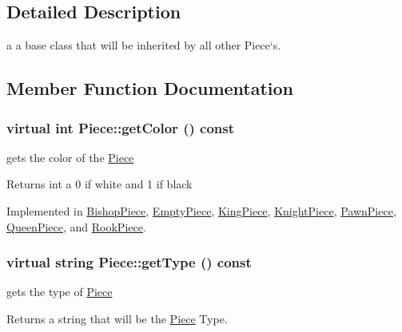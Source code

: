 \subsection{Detailed Description}
a a base class that will be inherited by all other Piece`s. 

\subsection{Member Function Documentation}
\hypertarget{classPiece_a1376072d4815719e60253ce5688df95c}{
\subsubsection[{getColor}]{\setlength{\rightskip}{0pt plus 5cm}virtual int Piece::getColor () const}}
\label{classPiece_a1376072d4815719e60253ce5688df95c}


gets the color of the \hyperlink{classPiece}{Piece} \begin{DoxyReturn}{Returns}
int a 0 if white and 1 if black 
\end{DoxyReturn}


Implemented in \hyperlink{classBishopPiece_ae40042d8edb9172b97955a1a3d651434}{BishopPiece}, \hyperlink{classEmptyPiece_aa0ae8e05e0471cf05e17bc9f56e30188}{EmptyPiece}, \hyperlink{classKingPiece_ac15e38c6ceaccae6879ec70211c2ab28}{KingPiece}, \hyperlink{classKnightPiece_ab8ef95a1a625e461ada96e4692599770}{KnightPiece}, \hyperlink{classPawnPiece_abe56912427ff110820b34223e5f60cda}{PawnPiece}, \hyperlink{classQueenPiece_a461d58f951b5e9f4d120cec0c47a1d9c}{QueenPiece}, and \hyperlink{classRookPiece_a15b00afd7fe0fe1035c64b884870c6e1}{RookPiece}.\hypertarget{classPiece_a5b88fcd786bb30b345b24fbc3ab24ab9}{
\subsubsection[{getType}]{\setlength{\rightskip}{0pt plus 5cm}virtual string Piece::getType () const}}
\label{classPiece_a5b88fcd786bb30b345b24fbc3ab24ab9}


gets the type of \hyperlink{classPiece}{Piece} \begin{DoxyReturn}{Returns}
a string that will be the \hyperlink{classPiece}{Piece} Type. 
\end{DoxyReturn}


